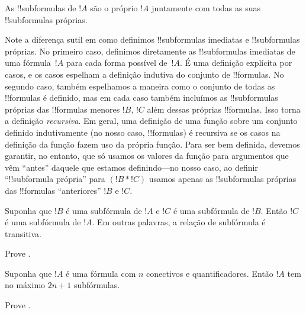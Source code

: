 \documentclass[../../../include/open-logic-section]{subfiles}
\begin{document}
\begin{defn}[!!^{subformula}]
As !!{subformula}s de $!A$ são o próprio $!A$ juntamente com todas as suas
!!{subformula}s próprias.
\end{defn}

\begin{explain}
Note a diferença sutil em como definimos !!{subformula}s
imediatas e !!{subformula}s próprias.  No primeiro caso,
definimos diretamente as !!{subformula}s imediatas de uma fórmula~$!A$
para cada forma possível de~$!A$.  É uma definição explícita por
casos, e os casos espelham a definição indutiva do conjunto de
!!{formula}s.  No segundo caso, também espelhamos a maneira como o
conjunto de todas as !!{formula}s é definido, mas em cada caso também
incluímos as !!{subformula}s próprias das !!{formula}s menores $!B$,
$!C$ além dessas próprias !!{formula}s.  Isso torna a
definição \emph{recursiva}.  Em geral, uma definição de uma função
sobre um conjunto definido indutivamente (no nosso caso, !!{formula}s) é recursiva
se os casos na definição da função fazem uso da
própria função. Para ser bem definida, devemos garantir, no entanto,
que só usamos os valores da função para argumentos que
vêm ``antes'' daquele que estamos definindo---no nosso caso, ao definir
``!!{subformula} própria'' para $(!B \ast !C)$ usamos apenas as
!!{subformula}s próprias das !!{formula}s ``anteriores'' $!B$ e $!C$.
\end{explain}

\begin{prop}
Suponha que $!B$ é uma subfórmula de $!A$ e $!C$ é uma subfórmula de $!B$.
Então $!C$ é uma subfórmula de $!A$. Em outras palavras, a relação de subfórmula
é transitiva.
\end{prop}

\begin{prob}
Prove .
\end{prob}

\begin{prop}
Suponha que $!A$ é uma fórmula com $n$ conectivos e quantificadores.
Então $!A$ tem no máximo $2n+1$ subfórmulas.
\end{prop}

\begin{prob}
Prove .
\end{prob}
\end{document}
